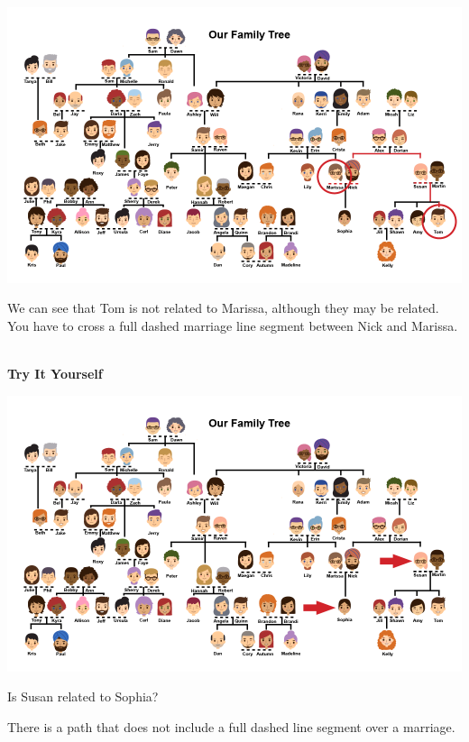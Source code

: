 \documentclass{ximera}
\begin{document}
\begin{example}
\quad \\

\begin{image}
\includegraphics{pics/Marissa_Tom.png}
\end{image}

We can see that Tom is not related to Marissa, although they may be related.  You have to cross a full dashed marriage line segment between Nick and Marissa.

\end{example}



\begin{example}
\quad \\
\textbf{Try It Yourself}

\begin{image}
\includegraphics{pics/Sophia_Susan_arrow.png}
\end{image}

Is Susan related to Sophia?
\begin{multipleChoice}
\end{multipleChoice}
\begin{feedback}
There is a path that does not include a full dashed line segment over a marriage.
\end{feedback}
\end{example}
\end{document}
